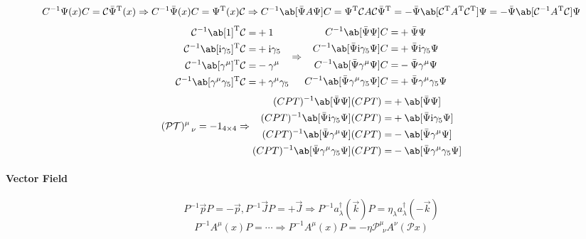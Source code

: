 \documentclass{article}
\newcommand{\calC}{\mathcal{C}}
\newcommand{\calP}{\mathcal{P}}
\newcommand{\calT}{\mathcal{T}}
\newcommand{\gammafive}{\gamma_5}
\newcommand{\gammamu}{\gamma^{\mu}}
\newcommand{\rmi}{\mathrm{i}}
\newcommand{\rmT}{\mathrm{T}}
\newcommand{\veck}{\vec{k}}
\newcommand{\vecp}{\vec{p}}
\begin{document}
\[ C^{-1} \Psi(x) C = \calC \bar{\Psi}^{\rmT}(x) \Rightarrow C^{-1} \bar{\Psi}(x) C = \Psi^{\rmT}(x) \calC \Rightarrow C^{-1} \ab[\bar{\Psi} A \Psi] C = \Psi^{\rmT} \calC A \calC \bar{\Psi}^{\rmT} = - \bar{\Psi} \ab[\calC^{\rmT} A^{\rmT} \calC^{\rmT}] \Psi = - \bar{\Psi} \ab[\calC^{-1} A^{\rmT} \calC] \Psi \]
\[ \begin{aligned}
        \calC^{-1} \ab[1]^\rmT \calC =                   & +1                    \\
        \calC^{-1} \ab[\rmi \gammafive]^\rmT \calC =     & + \rmi \gammafive     \\
        \calC^{-1} \ab[\gammamu]^\rmT \calC =            & - \gammamu            \\
        \calC^{-1} \ab[\gammamu \gammafive]^\rmT \calC = & + \gammamu \gammafive
    \end{aligned} \Rightarrow \begin{aligned}
        C^{-1} \ab[\bar{\Psi} \Psi] C =                     & + \bar{\Psi} \Psi                     \\
        C^{-1} \ab[\bar{\Psi} \rmi \gammafive \Psi] C =     & + \bar{\Psi} \rmi \gammafive \Psi     \\
        C^{-1} \ab[\bar{\Psi} \gammamu \Psi] C =            & - \bar{\Psi} \gammamu \Psi            \\
        C^{-1} \ab[\bar{\Psi} \gammamu \gammafive \Psi] C = & + \bar{\Psi} \gammamu \gammafive \Psi
    \end{aligned} \]
\[ (\calP\calT)^{\mu}_{\ \ \nu} = - 1_{4 \times 4} \Rightarrow \begin{aligned}
        (CPT)^{-1} \ab[\bar{\Psi} \Psi] (CPT) =                     & + \ab[\bar{\Psi} \Psi]                     \\
        (CPT)^{-1} \ab[\bar{\Psi} \rmi \gammafive \Psi] (CPT) =     & + \ab[\bar{\Psi} \rmi \gammafive \Psi]     \\
        (CPT)^{-1} \ab[\bar{\Psi} \gammamu \Psi] (CPT) =            & - \ab[\bar{\Psi} \gammamu \Psi]            \\
        (CPT)^{-1} \ab[\bar{\Psi} \gammamu \gammafive \Psi] (CPT) = & - \ab[\bar{\Psi} \gammamu \gammafive \Psi]
    \end{aligned} \]

\paragraph{Vector Field}

\[ P^{-1} \vecp P = - \vecp, P^{-1} \vec{J} P = + \vec{J} \Rightarrow P^{-1} a_\lambda^{\dagger}(\veck) P = \eta_{\lambda} a_\lambda^{\dagger}(- \veck) \]
\[ P^{-1} A^{\mu}(x) P = \cdots \Rightarrow P^{-1} A^{\mu}(x) P = - \eta \calP^{\mu}_{\ \ \nu} A^{\nu}(\calP x) \]
\end{document}
